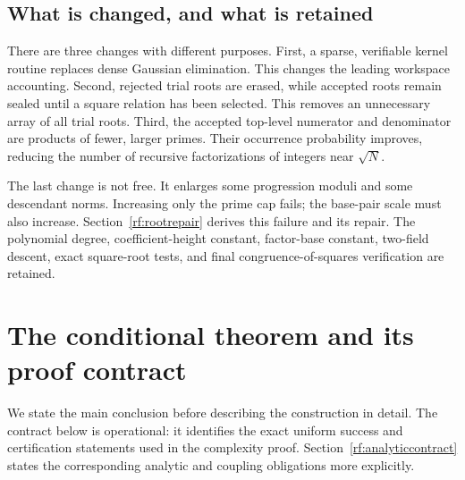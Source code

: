 \subsection{What is changed, and what is retained}

There are three changes with different purposes.
First, a sparse, verifiable kernel routine replaces dense Gaussian
elimination.  This changes the leading workspace accounting.
Second, rejected trial roots are erased, while accepted roots remain
sealed until a square relation has been selected.  This removes an
unnecessary array of all trial roots.
Third, the accepted top-level numerator and denominator are products
of fewer, larger primes.  Their occurrence probability improves,
reducing the number of recursive factorizations of integers near
$\sqrt N$.

The last change is not free.  It enlarges some progression moduli and
some descendant norms.  Increasing only the prime cap fails; the
base-pair scale must also increase.  Section~\ref{rf:rootrepair}
derives this failure and its repair.  The polynomial degree,
coefficient-height constant, factor-base constant, two-field descent,
exact square-root tests, and final congruence-of-squares verification
are retained.

\section{The conditional theorem and its proof contract}
\label{rf:contract}

We state the main conclusion before describing the construction in
detail.  The contract below is operational: it identifies the exact
uniform success and certification statements used in the complexity
proof.  Section~\ref{rf:analyticcontract} states the corresponding
analytic and coupling obligations more explicitly.

